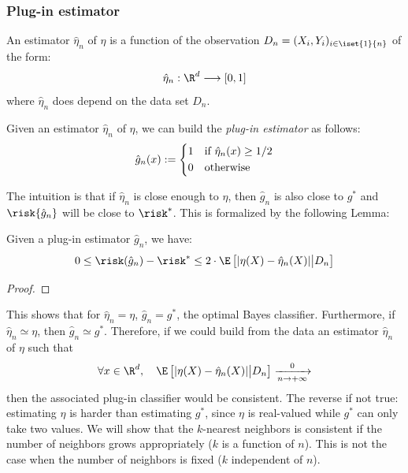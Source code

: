 \documentclass[toc, titlepaged]{../cs-classes/cs-classes}
\begin{document}
\subsubsection{Plug-in estimator}
\begin{definition}[Estimator]
    An estimator $\hat{\eta}_n$ of $\eta$ is a function of the observation $D_n=(X_i, Y_i)_{i\in\iset{1}{n}}$ of the form:
    \begin{equation*}
        \hat{\eta}_n : \R^d \longrightarrow [0, 1]
    \end{equation*}
    where $\hat{\eta}_n$ does depend on the data set $D_n$.
\end{definition}

\begin{definition}
    Given an estimator $\hat{\eta}_n$ of $\eta$, we can build the \emph{plug-in estimator} as follows:
    \begin{equation}
        \hat{g}_n(x) := \begin{cases*}
            1 & if $\hat{\eta}_n(x) \geq 1/2$\\
            0 & otherwise
        \end{cases*}
    \end{equation}
\end{definition}

The intuition is that if $\hat{\eta}_n$ is close enough to $\eta$, then $\hat{g}_n$ is also close to $g^*$ and $\risk{\hat{g}_n}$ will be close to $\risk^*$. This is formalized by the following Lemma:
\begin{lemma}
    Given a plug-in estimator $\hat{g}_n$, we have:
    \begin{equation*}
        0\leq\risk(\hat{g}_n) - \risk^* \leq 2\cdot\E\left[|\eta(X)-\hat{\eta}_n(X)| \big| D_n\right]
    \end{equation*}
\end{lemma}
\begin{proof}
\end{proof}

This shows that for $\hat{\eta}_n = \eta$, $\hat{g}_n = g^*$, the optimal Bayes classifier. Furthermore, if $\hat{\eta}_n\simeq\eta$, then $\hat{g}_n\simeq g^*$. Therefore, if we could build from the data an estimator $\hat{\eta}_n$ of $\eta$ such that
\begin{equation*}
    \forall x\in\R^d, \quad \E\left[|\eta(X)-\hat{\eta}_n(X)| \big| D_n\right] \xrightarrow[n\to+\infty] 0
\end{equation*}
then the associated plug-in classifier would be consistent. The reverse if not true: estimating $\eta$ is harder than estimating $g^*$, since $\eta$ is real-valued while $g^*$ can only take two values. We will show that the $k$-nearest neighbors is consistent if the number of neighbors grows appropriately ($k$ is a function of $n$). This is not the case when the number of neighbors is fixed ($k$ independent of $n$).
\end{document}
